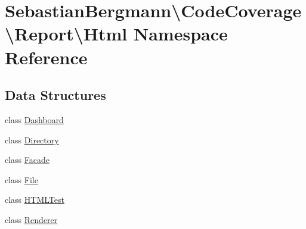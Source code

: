 \hypertarget{namespace_sebastian_bergmann_1_1_code_coverage_1_1_report_1_1_html}{}\section{Sebastian\+Bergmann\textbackslash{}Code\+Coverage\textbackslash{}Report\textbackslash{}Html Namespace Reference}
\label{namespace_sebastian_bergmann_1_1_code_coverage_1_1_report_1_1_html}
\subsection*{Data Structures}
\begin{DoxyCompactItemize}
\item 
class \mbox{\hyperlink{class_sebastian_bergmann_1_1_code_coverage_1_1_report_1_1_html_1_1_dashboard}{Dashboard}}
\item 
class \mbox{\hyperlink{class_sebastian_bergmann_1_1_code_coverage_1_1_report_1_1_html_1_1_directory}{Directory}}
\item 
class \mbox{\hyperlink{class_sebastian_bergmann_1_1_code_coverage_1_1_report_1_1_html_1_1_facade}{Facade}}
\item 
class \mbox{\hyperlink{class_sebastian_bergmann_1_1_code_coverage_1_1_report_1_1_html_1_1_file}{File}}
\item 
class \mbox{\hyperlink{class_sebastian_bergmann_1_1_code_coverage_1_1_report_1_1_html_1_1_h_t_m_l_test}{H\+T\+M\+L\+Test}}
\item 
class \mbox{\hyperlink{class_sebastian_bergmann_1_1_code_coverage_1_1_report_1_1_html_1_1_renderer}{Renderer}}
\end{DoxyCompactItemize}
